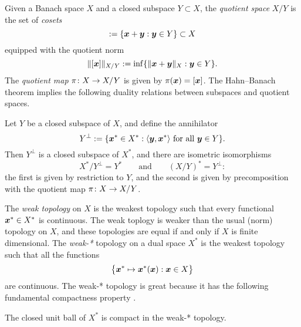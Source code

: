 Given a Banach space $X$ and a closed subspace $Y \subset X$, the \emph{quotient space} $X / Y$ is the set of \emph{cosets}
\begin{equation*}
  [\mb{x}] := \{\mb{x} + \mb{y} : \mb{y} \in Y\} \subset X
\end{equation*}
equipped with the quotient norm
\begin{equation*}
  \|[\bm{x}]\|_{X / Y} := \inf\{\|\bm{x} + \bm{y}\|_{X} : \bm{y} \in Y\}.
\end{equation*}
The \emph{quotient map} $\pi \colon X \rightarrow X / Y$ is given by $\pi(\bm{x}) = [\bm{x}]$.
The Hahn--Banach theorem implies the following duality relations between subspaces and quotient spaces.

\begin{prop}\label{prop:duality-subspace-quotient}
  Let $Y$ be a closed subspace of $X$, and define the annihilator
  \begin{equation*}
    Y^\perp := \{\bm{x}^* \in X^* : \text{$\langle \bm{y}, \bm{x}^* \rangle$ for all $\bm{y} \in Y$}\}. 
  \end{equation*}
  Then $Y^{\perp}$ is a closed subspace of $X^*$, and there are isometric isomorphisms
  \begin{equation*}
    X^* / Y^\perp = Y^* \qquad \text{and} \qquad (X/Y)^* = Y^{\perp}:
  \end{equation*}
  the first is given by restriction to $Y$, and the second is given by precomposition with the quotient map $\pi \colon X \rightarrow X / Y$.
\end{prop}

The \emph{weak topology} on $X$ is the weakest topology such that every functional $\bm{x}^* \in X^*$ is continuous.
The weak toplogy is weaker than the usual (norm) topology on $X$, and these topologies are equal if and only if $X$ is finite dimensional.
The \emph{weak-*} topology on a dual space $X^*$ is the weakest topology such that all the functions
\begin{equation*}
  \big\{ \bm{x}^* \mapsto \bm{x}^*(\bm{x}) : \bm{x} \in X\big\}
\end{equation*}
are continuous.
The weak-* topology is great because it has the following fundamental compactness property \cite[Theorem IV.21]{RS80}.

\begin{thm}
  The closed unit ball of $X^*$ is compact in the weak-* topology.
\end{thm}

